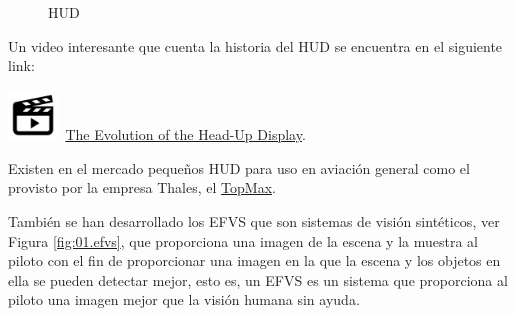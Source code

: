 \begin{figure}[!htb]
  \centering
  
  \caption{HUD}
\label{fig:01.HUD}
\end{figure}


\begin{tcolorbox}
Un video interesante que cuenta la historia del HUD se encuentra en el siguiente link: 

  {\includegraphics[width=0.1\textwidth]{01.tablero.instrumentos/U01.imagenes/Video.png}}\,
\href{https://www.youtube.com/watch?v=ypIbmfm7n8A}{The Evolution of the Head-Up Display}.
\vspace{3mm}


  Existen en el mercado peque\~nos \ac{HUD} para uso en aviaci\'on general como el provisto por la empresa Thales, el 
\href{https://www.thalesgroup.com/en/markets/aerospace/flight-deck-avionics-equipment-functions/topmax-wearable-hud-commercial-aircraft}{TopMax}.
\end{tcolorbox}


Tambi\'en se han desarrollado los \ac{EFVS} que son sistemas de visi\'on sint\'eticos, ver Figura \ref{fig:01.efvs}, 
 que proporciona una imagen de la escena y la muestra al piloto con el fin de proporcionar una imagen en la que la escena y los objetos en ella se pueden detectar mejor, esto es, un EFVS es un sistema que proporciona al piloto una imagen mejor que la visión humana sin ayuda. 

